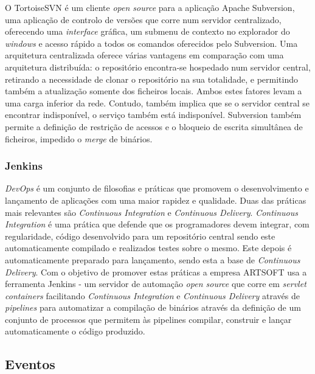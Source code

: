 \documentclass[sigplan]{acmart}
\begin{document}
O TortoiseSVN é um cliente \textit{open source} para a aplicação Apache Subversion, uma aplicação de controlo de versões que corre num servidor centralizado, oferecendo uma \textit{interface} gráfica, um submenu de contexto no explorador do \textit{windows} e acesso rápido a todos os comandos oferecidos pelo Subversion. Uma arquitetura centralizada oferece várias vantagens em comparação com uma arquitetura distribuída: o repositório encontra-se hospedado num servidor central, retirando a necessidade de clonar o repositório na sua totalidade, e permitindo também a atualização somente dos ficheiros locais\cite{subversion}. Ambos estes fatores levam a uma carga inferior da rede. Contudo, também implica que se o servidor central se encontrar indisponível, o serviço também está indisponível. Subversion também permite a definição de restrição de acessos e o bloqueio de escrita simultânea de ficheiros, impedido o \textit{merge} de binários.

\subsubsection{Jenkins}

\textit{DevOps} é um conjunto de filosofias e práticas que promovem o desenvolvimento e lançamento de aplicações com uma maior rapidez e qualidade. Duas das práticas mais relevantes são \textit{Continuous Integration} e \textit{Continuous Delivery}. \textit{Continuous Integration} é uma prática que defende que os programadores devem integrar, com regularidade, código desenvolvido para um repositório central sendo este automaticamente compilado e realizados testes sobre o mesmo. Este depois é automaticamente preparado para lançamento, sendo esta a base de \textit{Continuous Delivery}. Com o objetivo de promover estas práticas a empresa ARTSOFT usa a ferramenta Jenkins - um servidor de automação \textit{open source} que corre em \textit{servlet containers} facilitando \textit{Continuous Integration} e \textit{Continuous Delivery} através de \textit{pipelines} para automatizar a compilação de binários através da definição de um conjunto de processos que permitem às pipelines compilar, construir e lançar automaticamente o código produzido.

\subsection{Eventos}
\end{document}
